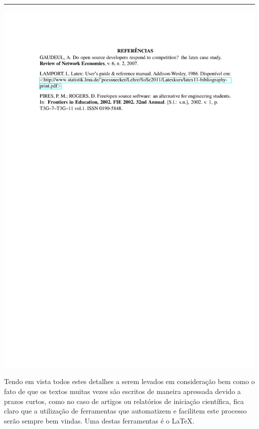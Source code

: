 {\hrule
\noindent\includegraphics[trim=0 20cm 0 0cm,clip]{contents/intro_writing_conference/references/utf-refs}

\clearpage}
\restoregeometry

Tendo em vista todos estes detalhes a serem levados em consideração bem como o fato de que os textos muitas vezes são escritos de maneira apressada devido a prazos curtos, como no caso de artigos ou relatórios de iniciação científica, fica claro que a utilização de ferramentas que automatizem e facilitem este processo serão sempre bem vindas. Uma destas ferramentas é o \LaTeX.



